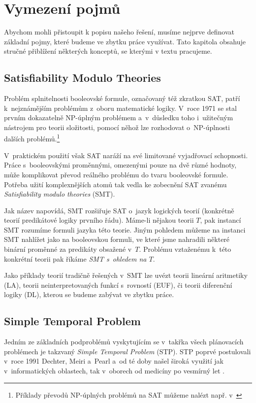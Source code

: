 \chapter{Vymezení pojmů}
Abychom mohli přistoupit k popisu našeho řešení, musíme nejprve definovat základní pojmy, které budeme ve zbytku práce využívat. Tato kapitola obsahuje stručné přiblížení některých konceptů, se kterými v textu pracujeme.

\section{Satisfiability Modulo Theories}

Problém splnitelnosti booleovské formule, označovaný též zkratkou SAT, patří k~nejznámějším problémům z~oboru matematické logiky. V~roce 1971 se stal prvním dokazatelně NP-úplným problémem \cite{Cook71} a~v~důsledku toho i~užitečným nástrojem pro teorii složitosti, pomocí něhož lze rozhodovat o~NP-úplnosti dalších problémů.\footnote{Příklady převodů NP-úplných problémů na SAT můžeme nalézt např. v~\cite[kapitola 19]{Mares17}}

V~praktickém použití však SAT naráží na své limitované vyjadřovací schopnosti. Práce s~booleovskými proměnnými, omezenými pouze na dvě různé hodnoty, může komplikovat převod reálného problému do tvaru booleovské formule. Potřeba užití komplexnějších atomů tak vedla ke zobecnění SAT zvanému \emph{Satisfiability modulo theories} (SMT).

Jak název napovídá, SMT rozšiřuje SAT o~jazyk logických teorií (konkrétně teorií predikátové logiky prvního řádu). Máme-li nějakou teorii $T$, pak instancí SMT rozumíme formuli jazyka této teorie. Jiným pohledem můžeme na instanci SMT nahlížet jako na booleovskou formuli, ve které jsme nahradili některé binární proměnné za predikáty obsažené v~$T$. Problému vztaženému k~této konkrétní teorii pak říkáme \emph{SMT s~ohledem na $T$}.

Jako příklady teorií tradičně řešených v~SMT lze uvézt teorii lineární aritmetiky (LA), teorii neinterpretovaných funkcí s~rovností (EUF), či teorii diferenční logiky (DL), kterou se budeme zabývat ve zbytku práce.

\section{Simple Temporal Problem}\label{stp}

Jedním ze základních podproblémů vyskytujícím se v~takřka všech plánovacích problémech je takzvaný \emph{Simple Temporal Problem} (STP). STP poprvé postulovali v~roce 1991 Dechter, Meiri a~Pearl \cite{Dechter91} a~od té doby našel široká využití jak v~informatických oblastech, tak v~oborech od medicíny \cite{Anselma06} po vesmírný let \cite{Fukunaga97}.

